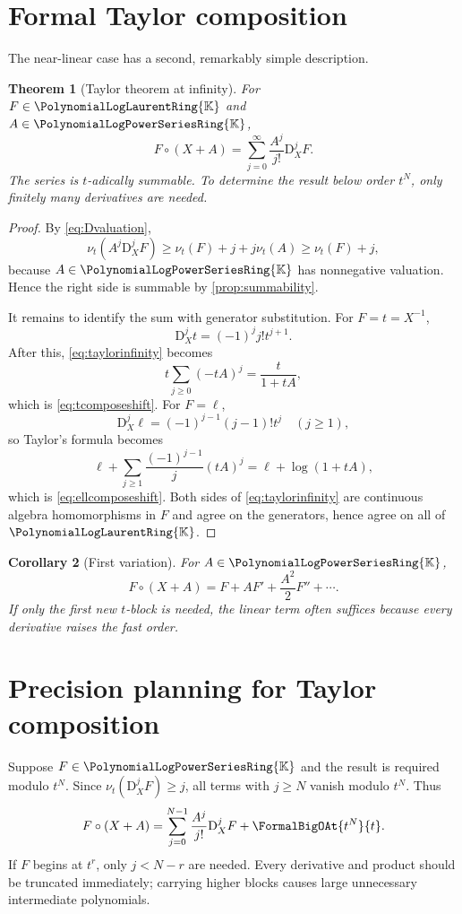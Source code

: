 \documentclass[11pt,oneside,openany]{book}
\newtheorem{theorem}{Theorem}[chapter]
\newtheorem{corollary}[theorem]{Corollary}
\newcommand{\K}{\mathbb{K}}
\newcommand{\Rring}{\PolynomialLogPowerSeriesRing{\K}}
\newcommand{\Pring}{\PolynomialLogLaurentRing{\K}}
\newcommand{\ordt}{\nu_t}
\newcommand{\compose}{\mathbin{\circ}}
\newcommand{\D}{\mathrm{D}}
\begin{document}
\section{Formal Taylor composition}
The near-linear case has a second, remarkably simple description.

\begin{theorem}[Taylor theorem at infinity]\label{thm:taylorinfinity}
For \(F\in\Pring\) and \(A\in\Rring\),
\begin{equation}\label{eq:taylorinfinity}
 F\compose(X+A)
 =\sum_{j=0}^{\infty}\frac{A^j}{j!}\D_X^jF.
\end{equation}
The series is \(t\)-adically summable.  To determine the result below order
\(t^N\), only finitely many derivatives are needed.
\end{theorem}

\begin{proof}
By \cref{eq:Dvaluation},
\[
 \ordt\!\left(A^j\D_X^jF\right)
 \geq \ordt(F)+j+j\ordt(A)
 \geq\ordt(F)+j,
\]
because \(A\in\Rring\) has nonnegative valuation.  Hence the right side is
summable by \cref{prop:summability}.

It remains to identify the sum with generator substitution.  For \(F=t=X^{-1}\),
\[
 \D_X^jt=(-1)^jj!t^{j+1}.
\]
After this, \cref{eq:taylorinfinity} becomes
\[
 t\sum_{j\geq0}(-tA)^j=\frac{t}{1+tA},
\]
which is \cref{eq:tcomposeshift}.  For \(F=\ell\),
\[
 \D_X^j\ell=(-1)^{j-1}(j-1)!t^j
 \quad(j\geq1),
\]
so Taylor's formula becomes
\[
 \ell+\sum_{j\geq1}\frac{(-1)^{j-1}}{j}(tA)^j
 =\ell+\log(1+tA),
\]
which is \cref{eq:ellcomposeshift}.  Both sides of
\cref{eq:taylorinfinity} are continuous algebra homomorphisms in \(F\) and
agree on the generators, hence agree on all of \(\Pring\).
\end{proof}

\begin{corollary}[First variation]\label{cor:firstvariation}
For \(A\in\Rring\),
\begin{equation}\label{eq:firstvariation}
 F\compose(X+A)
 =F+A F'+\frac{A^2}{2}F''+\cdots.
\end{equation}
If only the first new \(t\)-block is needed, the linear term often suffices
because every derivative raises the fast order.
\end{corollary}

\section{Precision planning for Taylor composition}
Suppose \(F\in\Rring\) and the result is required modulo \(t^N\).  Since
\(\ordt(\D_X^jF)\geq j\), all terms with \(j\geq N\) vanish modulo \(t^N\).
Thus
\begin{equation}\label{eq:taylorfiniteN}
 F\compose(X+A)
 =\sum_{j=0}^{N-1}\frac{A^j}{j!}\D_X^jF
   +\FormalBigOAt{t^N}{t}.
\end{equation}
If \(F\) begins at \(t^r\), only \(j<N-r\) are needed.  Every derivative and
product should be truncated immediately; carrying higher blocks causes large
unnecessary intermediate polynomials.
\end{document}

